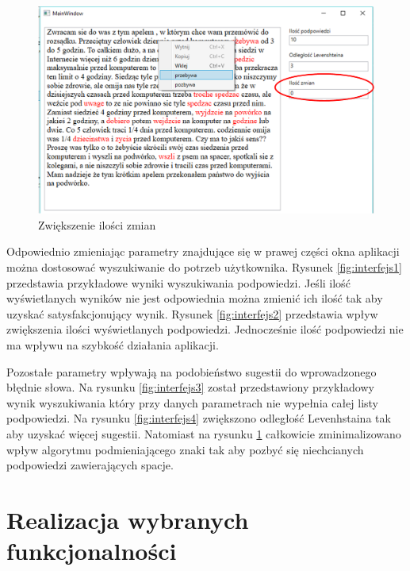 \begin{figure} [H]
	\centering
	\includegraphics[width=1\linewidth]{rozdzial03/screen6_1.png}
	\caption{Zwiększenie ilości zmian}
	\label{fig:interfejs5}
\end{figure}

Odpowiednio zmieniając parametry znajdujące się w prawej części okna aplikacji można dostosować wyszukiwanie do potrzeb użytkownika. Rysunek \ref{fig:interfejs1} przedstawia przykładowe wyniki wyszukiwania podpowiedzi. Jeśli ilość wyświetlanych wyników nie jest odpowiednia można zmienić ich ilość tak aby uzyskać satysfakcjonujący wynik. Rysunek \ref{fig:interfejs2} przedstawia wpływ zwiększenia ilości wyświetlanych podpowiedzi. Jednocześnie ilość podpowiedzi nie ma wpływu na szybkość działania aplikacji. 

Pozostałe parametry wpływają na podobieństwo sugestii do wprowadzonego błędnie słowa. Na rysunku \ref{fig:interfejs3} został przedstawiony przykładowy wynik wyszukiwania który przy danych parametrach nie wypełnia całej listy podpowiedzi. Na rysunku \ref{fig:interfejs4} zwiększono odległość Levenhstaina tak aby uzyskać więcej sugestii. Natomiast na rysunku \ref{fig:interfejs5} całkowicie zminimalizowano wpływ algorytmu podmieniającego znaki tak aby pozbyć się niechcianych podpowiedzi zawierających spacje.
 
\section{Realizacja wybranych funkcjonalności}

